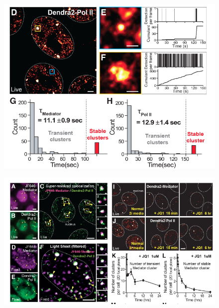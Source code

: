 \documentclass[aspectratio=1610]{beamer}					%
\begin{document}
\begin{frame}{}
\begin{figure}
\includegraphics[width=12cm]{figure-1-2.png}
\end{figure}
\end{frame}


\begin{frame}{}
\begin{figure}
\includegraphics[width=14cm]{figure-2-1.png}
\end{figure}
\end{frame}
\end{document}
